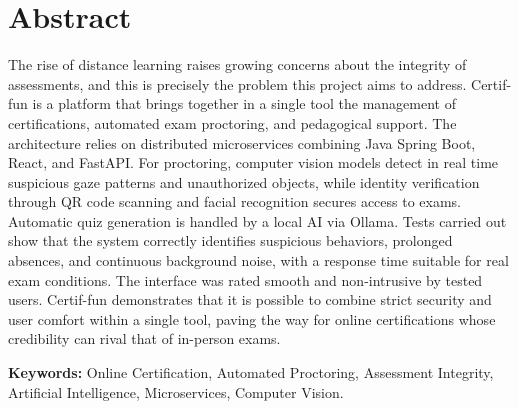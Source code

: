 \chapter*{Abstract}

The rise of distance learning raises growing concerns about the integrity of assessments, and this is precisely the problem this project aims to address. Certif-fun is a platform that brings together in a single tool the management of certifications, automated exam proctoring, and pedagogical support. The architecture relies on distributed microservices combining Java Spring Boot, React, and FastAPI. For proctoring, computer vision models detect in real time suspicious gaze patterns and unauthorized objects, while identity verification through QR code scanning and facial recognition secures access to exams. Automatic quiz generation is handled by a local AI via Ollama. Tests carried out show that the system correctly identifies suspicious behaviors, prolonged absences, and continuous background noise, with a response time suitable for real exam conditions. The interface was rated smooth and non-intrusive by tested users. Certif-fun demonstrates that it is possible to combine strict security and user comfort within a single tool, paving the way for online certifications whose credibility can rival that of in-person exams.

\bigskip
\noindent \textbf{Keywords:} Online Certification, Automated Proctoring, Assessment Integrity, Artificial Intelligence, Microservices, Computer Vision.
